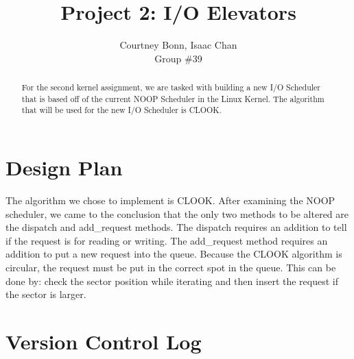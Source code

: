 \documentclass[letterpaper,10pt,draftclsnofoot,onecolumn,titlepage]{IEEEtran}
\def\name{Courtney Bonn, Isaac Chan}
\def\grp{Group \#39}
\begin{document}
\title{Project 2: I/O Elevators}
\author{\name \\ \grp}

\maketitle

\begin{abstract}
For the second kernel assignment, we are tasked with building a new I/O Scheduler that is based off of the current NOOP Scheduler in the Linux Kernel. 
The algorithm that will be used for the new I/O Scheduler is CLOOK. 
\end{abstract}

\clearpage
\section{Design Plan}
The algorithm we chose to implement is CLOOK. After examining the NOOP scheduler, we came to the conclusion that the only two methods to be altered 
are the dispatch and add\_request methods. The dispatch requires an addition to tell if the request is for reading or writing. The add\_request method 
requires an addition to put a new request into the queue. Because the CLOOK algorithm is circular, the request must be put in the correct spot in the 
queue. This can be done by: check the sector position while iterating and then insert the request if the sector is larger. 
    
\section{Version Control Log}
%
\end{document}
